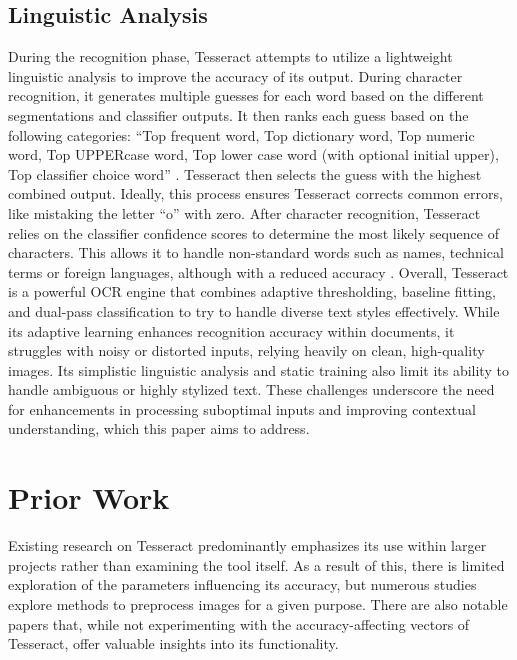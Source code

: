 \documentclass[10pt,twocolumn]{article}
\begin{document}
\subsection{Linguistic Analysis}
During the recognition phase, Tesseract attempts to utilize a lightweight linguistic analysis to improve the accuracy of its output. During character recognition, it generates multiple guesses for each word based on the different segmentations and classifier outputs. It then ranks each guess based on the following categories: “Top frequent word, Top dictionary word, Top numeric word, Top UPPERcase word, Top lower case word (with optional initial upper), Top classifier choice word” \cite{Overview_Smith}. Tesseract then selects the guess with the highest combined output. Ideally, this process ensures Tesseract corrects  common errors, like mistaking the letter “o” with zero. After character recognition, Tesseract relies on the classifier confidence scores to determine the most likely sequence of characters. This allows it to handle non-standard words such as names, technical terms or foreign languages, although with a reduced accuracy \cite{Overview_Smith}.
\newline \newline
Overall, Tesseract is a powerful OCR engine that combines adaptive thresholding, baseline fitting, and dual-pass classification to try to handle diverse text styles effectively. While its adaptive learning enhances recognition accuracy within documents, it struggles with noisy or distorted inputs, relying heavily on clean, high-quality images. Its simplistic linguistic analysis and static training also limit its ability to handle ambiguous or highly stylized text. These challenges underscore the need for enhancements in processing suboptimal inputs and improving contextual understanding, which this paper aims to address.

\section{Prior Work}
Existing research on Tesseract predominantly emphasizes its use within larger projects rather than examining the tool itself. As a result of this, there is limited exploration of the parameters influencing its accuracy, but numerous studies explore methods to preprocess images for a given purpose. There are also notable papers that, while not experimenting with the accuracy-affecting vectors of Tesseract, offer valuable insights into its functionality.
\end{document}
